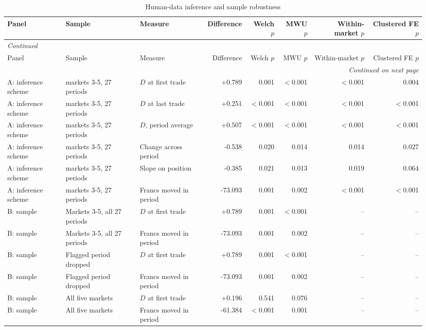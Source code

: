 \tiny
\begin{longtable}{p{2.1cm}p{3.5cm}p{3.0cm}rrrrr}
\caption{Human-data inference and sample robustness}\label{tab:app-human-robustness}\\
\toprule
Panel & Sample & Measure & Difference & Welch $p$ & MWU $p$ & Within-market $p$ & Clustered FE $p$ \\
\midrule
\endfirsthead
\multicolumn{8}{l}{\textit{Continued}}\\
\toprule
Panel & Sample & Measure & Difference & Welch $p$ & MWU $p$ & Within-market $p$ & Clustered FE $p$ \\
\midrule
\endhead
\midrule
\multicolumn{8}{r}{\textit{Continued on next page}}\\
\endfoot
\bottomrule
\endlastfoot
A: inference scheme & markets 3-5, 27 periods & $D$ at first trade & +0.789 & 0.001 & $<$0.001 & $<$0.001 & 0.004 \\
A: inference scheme & markets 3-5, 27 periods & $D$ at last trade & +0.251 & $<$0.001 & $<$0.001 & $<$0.001 & $<$0.001 \\
A: inference scheme & markets 3-5, 27 periods & $D$, period average & +0.507 & $<$0.001 & $<$0.001 & $<$0.001 & $<$0.001 \\
A: inference scheme & markets 3-5, 27 periods & Change across period & -0.538 & 0.020 & 0.014 & 0.014 & 0.027 \\
A: inference scheme & markets 3-5, 27 periods & Slope on position & -0.385 & 0.021 & 0.013 & 0.019 & 0.064 \\
A: inference scheme & markets 3-5, 27 periods & Francs moved in period & -73.093 & 0.001 & 0.002 & $<$0.001 & $<$0.001 \\
B: sample & Markets 3-5, all 27 periods & $D$ at first trade & +0.789 & 0.001 & $<$0.001 & -- & -- \\
B: sample & Markets 3-5, all 27 periods & Francs moved in period & -73.093 & 0.001 & 0.002 & -- & -- \\
B: sample & Flagged period dropped & $D$ at first trade & +0.789 & 0.001 & $<$0.001 & -- & -- \\
B: sample & Flagged period dropped & Francs moved in period & -73.093 & 0.001 & 0.002 & -- & -- \\
B: sample & All five markets & $D$ at first trade & +0.196 & 0.541 & 0.076 & -- & -- \\
B: sample & All five markets & Francs moved in period & -61.384 & $<$0.001 & 0.001 & -- & -- \\
\end{longtable}
